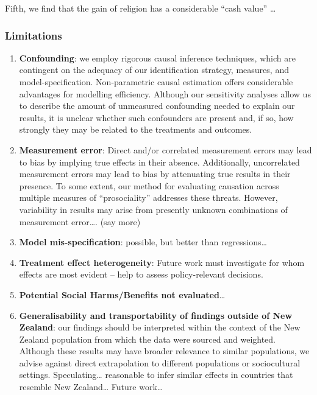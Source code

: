 \documentclass[
  single column]{article}
\begin{document}
Fifth, we find that the gain of religion has a considerable ``cash
value'' \ldots{}

\subsubsection{Limitations}\label{limitations}

\begin{enumerate}
\def\labelenumi{\arabic{enumi}.}
\item
  \textbf{Confounding}: we employ rigorous causal inference techniques,
  which are contingent on the adequacy of our identification strategy,
  measures, and model-specification. Non-parametric causal estimation
  offers considerable advantages for modelling efficiency. Although our
  sensitivity analyses allow us to describe the amount of unmeasured
  confounding needed to explain our results, it is unclear whether such
  confounders are present and, if so, how strongly they may be related
  to the treatments and outcomes.
\item
  \textbf{Measurement error}: Direct and/or correlated measurement
  errors may lead to bias by implying true effects in their absence.
  Additionally, uncorrelated measurement errors may lead to bias by
  attenuating true results in their presence. To some extent, our method
  for evaluating causation across multiple measures of ``prosociality''
  addresses these threats. However, variability in results may arise
  from presently unknown combinations of measurement error\ldots. (say
  more)
\item
  \textbf{Model mis-specification}: possible, but better than
  regressions\ldots{}
\item
  \textbf{Treatment effect heterogeneity}: Future work must investigate
  for whom effects are most evident -- help to assess policy-relevant
  decisions.
\item
  \textbf{Potential Social Harms/Benefits not evaluated}\ldots{}
\item
  \textbf{Generalisability and transportability of findings outside of
  New Zealand}: our findings should be interpreted within the context of
  the New Zealand population from which the data were sourced and
  weighted. Although these results may have broader relevance to similar
  populations, we advise against direct extrapolation to different
  populations or sociocultural settings. Speculating\ldots{} reasonable
  to infer similar effects in countries that resemble New
  Zealand\ldots{} Future work\ldots{}
\end{enumerate}
\end{document}

